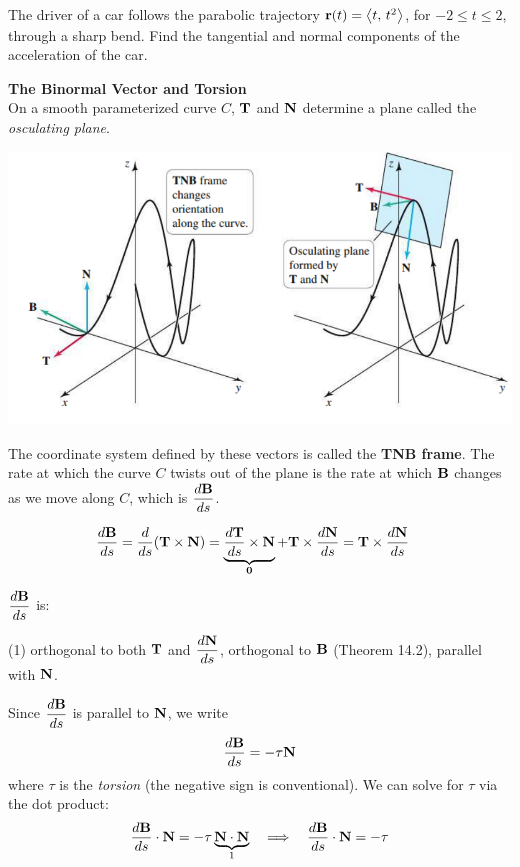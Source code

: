 \documentclass[mathNotesPreamble]{subfiles}
\begin{document}
  \begin{ex*}
    The driver of a car follows the parabolic trajectory ${\mathbf{r}}(t)={\left\langle t,\,t^2 \right\rangle}$, for $-2\leq t\leq 2$, through a sharp bend. Find the tangential and normal components of the acceleration of the car.
  \end{ex*}
  \pagebreak

  \textbf{The Binormal Vector and Torsion}\\
  On a smooth parameterized curve $C$, ${\mathbf{T}}$ and ${\mathbf{N}}$ determine a plane called the \textit{osculating plane}. 
  
  \begin{center}
    \includegraphics[width=0.6\linewidth]{images/briggs_14_05/fig14_37}
  \end{center}
  
  The coordinate system defined by these vectors is called the \textbf{TNB frame}. The rate at which the curve $C$ twists out of the plane is the rate at which ${\mathbf{B}}$ changes as we move along $C$, which is $\displaystyle\frac{d{\mathbf{B}}}{ds}$.

  \begin{align*}
    \frac{d{\mathbf{B}}}{ds}&= \frac{d}{ds}{\left({\mathbf{T}}\times{\mathbf{N}}\right)}
      =\underbrace{\frac{d{\mathbf{T}}}{ds}\times{\mathbf{N}}}_{\mathbf{0}}+{\mathbf{T}}\times \frac{d{\mathbf{N}}}{ds}
      ={\mathbf{T}}\times \frac{d{\mathbf{N}}}{ds}
  \end{align*}

  $\displaystyle\frac{d{\mathbf{B}}}{ds}$ is:
  \begin{tasks}[label=\textbullet](1)
    \task orthogonal to both ${\mathbf{T}}$ and $\displaystyle\frac{d{\mathbf{N}}}{ds}$,
    \task orthogonal to ${\mathbf{B}}$ (Theorem 14.2),
    \task parallel with ${\mathbf{N}}$.
  \end{tasks}
  \pagebreak

  Since $\displaystyle\frac{d{\mathbf{B}}}{ds}$ is parallel to ${\mathbf{N}}$, we write
    \[\frac{d{\mathbf{B}}}{ds}=-\tau{\mathbf{N}}\]
  where $\tau$ is the \textit{torsion} (the negative sign is conventional). We can solve for $\tau$ via the dot product:
  \begin{align*}
    \frac{d{\mathbf{B}}}{ds}\cdot{\mathbf{N}}=-\tau \underbrace{{\mathbf{N}}\cdot{\mathbf{N}}}_1 \quad\Longrightarrow\quad
    \frac{d{\mathbf{B}}}{ds}\cdot{\mathbf{N}}=-\tau
  \end{align*}
\end{document}

